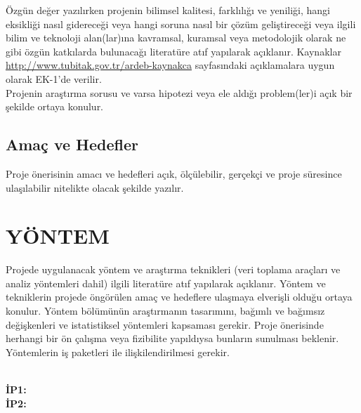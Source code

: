 \documentclass[a4paper]{article}
\begin{document}
\noindent Özgün değer yazılırken projenin bilimsel kalitesi, farklılığı ve yeniliği, hangi eksikliği nasıl gidereceği veya hangi soruna
nasıl bir çözüm geliştireceği veya ilgili bilim ve teknoloji alan(lar)ına kavramsal, kuramsal veya metodolojik olarak ne gibi
özgün katkılarda bulunacağı literatüre atıf yapılarak açıklanır. Kaynaklar \url{http://www.tubitak.gov.tr/ardeb-kaynakca}
sayfasındaki açıklamalara uygun olarak EK-1’de verilir.\\

\noindent Projenin araştırma sorusu ve varsa hipotezi veya ele aldığı problem(ler)i açık bir şekilde ortaya konulur.

\begin{framed}

\lipsum[1-5]

\end{framed}

\subsection{Amaç ve Hedefler}

\noindent Proje önerisinin amacı ve hedefleri açık, ölçülebilir, gerçekçi ve proje süresince ulaşılabilir nitelikte olacak şekilde yazılır.

\begin{framed}
\lipsum[1-3]
\end{framed}

\section{YÖNTEM} 

\noindent Projede uygulanacak yöntem ve araştırma teknikleri (veri toplama araçları ve analiz yöntemleri dahil) ilgili literatüre atıf
yapılarak açıklanır. Yöntem ve tekniklerin projede öngörülen amaç ve hedeflere ulaşmaya elverişli olduğu ortaya konulur.
Yöntem bölümünün araştırmanın tasarımını, bağımlı ve bağımsız değişkenleri ve istatistiksel yöntemleri kapsaması
gerekir. Proje önerisinde herhangi bir ön çalışma veya fizibilite yapıldıysa bunların sunulması beklenir. Yöntemlerin iş
paketleri ile ilişkilendirilmesi gerekir.

\begin{framed}
\lipsum[1-5]\\

\textbf{İP1:} 
\lipsum[1-5]\\

\textbf{İP2:} 
\lipsum[1-5]
\end{framed}
\end{document}
